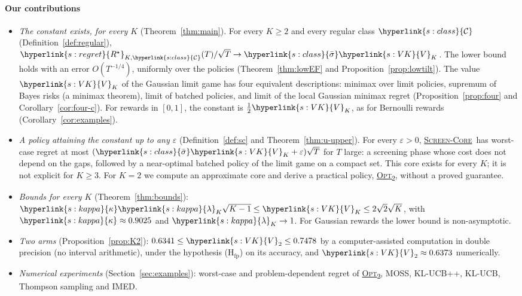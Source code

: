 \documentclass[11pt]{article}
\DeclareRobustCommand{\sy}[2]{{\hyperlink{#1}{#2}}}
\newcommand{\1}{\mathbf{1}}
\newcommand{\Rs}{\sy{s:regret}{R^\star}}
\newcommand{\Cl}{\sy{s:class}{\mathcal C}}
\newcommand{\sbar}{\sy{s:class}{\bar\sigma}}
\newcommand{\VK}{\sy{s:VK}{V}}
\newcommand{\kap}{\sy{s:kappa}{\kappa}}
\newcommand{\lamK}{\sy{s:kappa}{\lambda}}
\newcommand{\SC}{\sy{alg:sc}{\textsc{Screen-Core}}}
\newcommand{\OPT}{\sy{alg:opt}{\textsc{Opt}\textsubscript{2}}}
\begin{document}
\paragraph{Our contributions}
\begin{itemize}
\item \emph{The constant exists, for every $K$} (Theorem~\ref{thm:main}). For every $K\ge2$ and every regular class $\Cl$ (Definition~\ref{def:regular}),
$\Rs_{K,\Cl}(T)/\sqrt T\to\sbar\VK_K$. The lower bound holds with an error $O(T^{-1/4})$, uniformly over the policies (Theorem~\ref{thm:lowEF} and
Proposition~\ref{prop:lowtilt}). The value $\VK_K$ of the Gaussian limit game has four equivalent descriptions: minimax over limit policies, supremum
of Bayes risks (a minimax theorem), limit of batched policies, and limit of the local Gaussian minimax regret (Proposition~\ref{prop:four} and
Corollary~\ref{cor:four-c}). For rewards in $[0,1]$, the constant is $\frac12\VK_K$, as for Bernoulli rewards (Corollary~\ref{cor:examples}).
\item \emph{A policy attaining the constant up to any $\varepsilon$} (Definition~\ref{def:sc} and Theorem~\ref{thm:u-upper}). For every
$\varepsilon>0$, \SC\ has worst-case regret at most $(\sbar\VK_K+\varepsilon)\sqrt T$ for $T$ large: a screening phase whose cost does not depend on
the gaps, followed by a near-optimal batched policy of the limit game on a compact set. This core exists for every $K$; it is not explicit for
$K\ge3$. For $K=2$ we compute an approximate core and derive a practical policy, \OPT, without a proved guarantee.
\item \emph{Bounds for every $K$} (Theorem~\ref{thm:bounds}): $\kap\lamK_K\sqrt{K-1}\le\VK_K\le2\sqrt2\sqrt K$, with $\kap\approx0.9025$ and
$\lamK_K\to1$. For Gaussian rewards the lower bound is non-asymptotic.
\item \emph{Two arms} (Proposition~\ref{prop:K2}): $0.6341\le\VK_2\le0.7478$ by a computer-assisted computation in double precision (no interval
arithmetic), under the hypothesis (H$_{\mathrm{fp}}$) on its accuracy, and $\VK_2\approx0.6373$ numerically.
\item \emph{Numerical experiments} (Section~\ref{sec:examples}): worst-case and problem-dependent regret of \OPT, MOSS, KL-UCB++, KL-UCB, Thompson
sampling and IMED.
\end{itemize}
\end{document}

